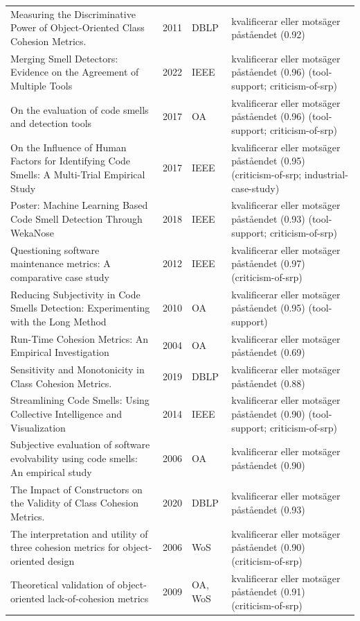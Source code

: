 \begin{longtable}{@{}%
  >{\raggedright\arraybackslash}p{}c%
  >{\raggedright\arraybackslash}p{}%
  >{\raggedright\arraybackslash}p{}@{}}
Measuring the Discriminative Power of Object-Oriented Class Cohesion Metrics. & 2011 & DBLP & kvalificerar eller motsäger påståendet (0.92) \\
Merging Smell Detectors: Evidence on the Agreement of Multiple Tools & 2022 & IEEE & kvalificerar eller motsäger påståendet (0.96) (tool-support; criticism-of-srp) \\
On the evaluation of code smells and detection tools & 2017 & OA & kvalificerar eller motsäger påståendet (0.96) (tool-support; criticism-of-srp) \\
On the Influence of Human Factors for Identifying Code Smells: A Multi-Trial Empirical Study & 2017 & IEEE & kvalificerar eller motsäger påståendet (0.95) (criticism-of-srp; industrial-case-study) \\
Poster: Machine Learning Based Code Smell Detection Through WekaNose & 2018 & IEEE & kvalificerar eller motsäger påståendet (0.93) (tool-support; criticism-of-srp) \\
Questioning software maintenance metrics: A comparative case study & 2012 & IEEE & kvalificerar eller motsäger påståendet (0.97) (criticism-of-srp) \\
Reducing Subjectivity in Code Smells Detection: Experimenting with the Long Method & 2010 & OA & kvalificerar eller motsäger påståendet (0.95) (tool-support) \\
Run-Time Cohesion Metrics: An Empirical Investigation & 2004 & OA & kvalificerar eller motsäger påståendet (0.69) \\
Sensitivity and Monotonicity in Class Cohesion Metrics. & 2019 & DBLP & kvalificerar eller motsäger påståendet (0.88) \\
Streamlining Code Smells: Using Collective Intelligence and Visualization & 2014 & IEEE & kvalificerar eller motsäger påståendet (0.90) (tool-support; criticism-of-srp) \\
Subjective evaluation of software evolvability using code smells: An empirical study & 2006 & OA & kvalificerar eller motsäger påståendet (0.90) \\
The Impact of Constructors on the Validity of Class Cohesion Metrics. & 2020 & DBLP & kvalificerar eller motsäger påståendet (0.93) \\
The interpretation and utility of three cohesion metrics for object-oriented design & 2006 & WoS & kvalificerar eller motsäger påståendet (0.90) (criticism-of-srp) \\
Theoretical validation of object-oriented lack-of-cohesion metrics & 2009 & OA, WoS & kvalificerar eller motsäger påståendet (0.91) (criticism-of-srp) \\

\end{longtable}

